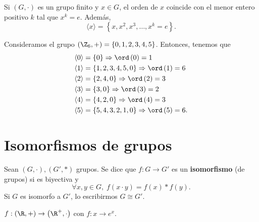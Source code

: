 \begin{fprop}[]
\normalfont Si $\displaystyle \left(G, \cdot\right) $ es un grupo finito y $\displaystyle x \in G $, el orden de $\displaystyle x $ coincide con el menor entero positivo $\displaystyle k $ tal que $\displaystyle x^{k} = e $. Además, 
\[\langle x \rangle = \left\{ x, x^{2}, x^{3}, \ldots, x^{k} = e\right\}  .\]
\end{fprop}

\begin{eg}
	\normalfont Consideramos el grupo $\displaystyle \left(\Z_{6}, +\right) = \left\{ 0, 1, 2, 3, 4, 5\right\} $. Entonces, tenemos que 
	\[
	\begin{split}
		\langle 0 \rangle & = \left\{ 0\right\} \Rightarrow \ord\left(0\right) = 1\\
		\langle 1 \rangle & = \left\{ 1, 2, 3, 4, 5, 0\right\} \Rightarrow \ord\left(1\right) = 6 \\
		\langle 2 \rangle & = \left\{ 2, 4, 0\right\} \Rightarrow \ord\left(2\right) = 3 \\
		\langle 3 \rangle & = \left\{ 3, 0\right\} \Rightarrow \ord\left(3\right) = 2 \\
		\langle 4 \rangle & = \left\{ 4, 2, 0\right\} \Rightarrow \ord\left(4\right) = 3\\
		\langle 5 \rangle & = \left\{ 5, 4, 3, 2, 1, 0\right\} \Rightarrow \ord\left(5\right) = 6 .
	\end{split}
	\]
\end{eg}

\section{Isomorfismos de grupos}
\begin{fdefinition}[Isomorfismo]
\normalfont Sean $\displaystyle \left(G, \cdot \right), \left(G', *\right) $ grupos. Se dice que $\displaystyle f: G \to G' $ es un \textbf{isomorfismo} (de grupos) si es biyectiva y 
\[\forall x, y \in G, \; f\left(x \cdot y\right) = f\left(x\right) * f\left(y\right) .\]
Si $\displaystyle G $ es isomorfo a $\displaystyle G' $, lo escribirmos $\displaystyle G \cong G' $.
\end{fdefinition}
\begin{eg}
\normalfont $\displaystyle f: \left(\R, +\right) \to \left(\R^{+}, \cdot \right) $ con $\displaystyle f : x \to e^{x} $.
\end{eg}

